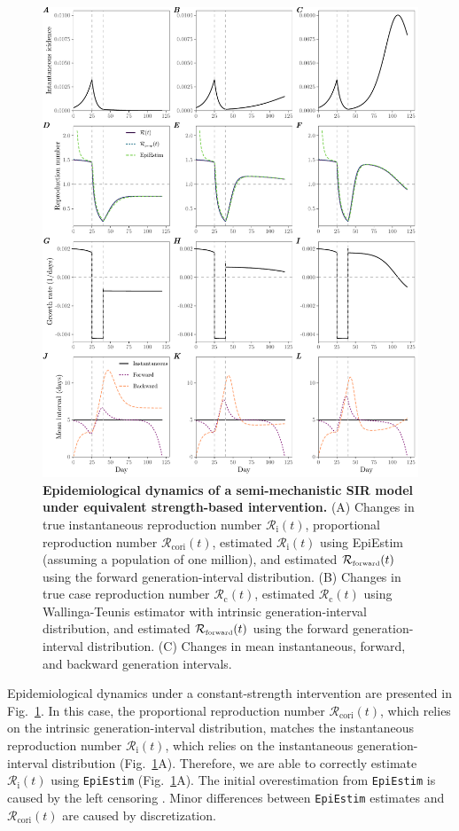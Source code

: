 \documentclass[12pt]{article}
\newcommand{\fref}[1]{Fig.~\ref{fig:#1}}
\newcommand{\Rx}[1]{\ensuremath{{\mathcal R}_{#1}}\xspace}
\newcommand{\Rc}{\Rx{\mathrm{c}}}
\newcommand{\Ri}{\Rx{\mathrm{i}}}
\newcommand{\RR}{\ensuremath{{\mathcal R}}\xspace}
\newcommand{\Rcori}{\Rx{\mathrm{cori}}}
\newcommand{\tsub}[2]{#1_{{\textrm{\tiny #2}}}}
\begin{document}
\begin{figure}[!th]
\includegraphics[width=\textwidth]{figure_sir_beta.pdf}
\caption{
\textbf{Epidemiological dynamics of a semi-mechanistic SIR model under equivalent strength-based intervention.}
(A) Changes in true instantaneous reproduction number $\Ri(t)$, proportional reproduction number $\Rcori(t)$, estimated $\Ri(t)$ using EpiEstim (assuming a population of one million), and estimated $\tsub{\RR}{forward}(t)$ using the forward generation-interval distribution.
(B) Changes in true case reproduction number $\Rc(t)$, estimated $\Rc(t)$ using Wallinga-Teunis estimator with intrinsic generation-interval distribution, and estimated $\tsub{\RR}{forward}(t)$ using the forward generation-interval distribution.
(C) Changes in mean instantaneous, forward, and backward generation intervals.
}
\label{fig:sir_beta}
\end{figure}

Epidemiological dynamics under a constant-strength intervention are presented in \fref{sir_beta}.
In this case, the proportional reproduction number $\Rcori(t)$, which relies on the intrinsic generation-interval distribution, matches the instantaneous reproduction number $\Ri(t)$, which relies on the instantaneous generation-interval distribution (\fref{sir_beta}A).
Therefore, we are able to correctly estimate $\Ri(t)$ using \texttt{EpiEstim} (\fref{sir_beta}A).
The initial overestimation from \texttt{EpiEstim} is caused by the left censoring \citep{gostic2020practical}.
Minor differences between \texttt{EpiEstim} estimates and $\Rcori(t)$ are caused by discretization.
\end{document}
